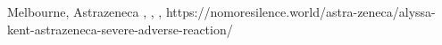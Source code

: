           {Melbourne, }
          {}
          {Astrazeneca}
          {}
          {
            ,
            ,           
            ,
          }
          {https://nomoresilence.world/astra-zeneca/alyssa-kent-astrazeneca-severe-adverse-reaction/}


